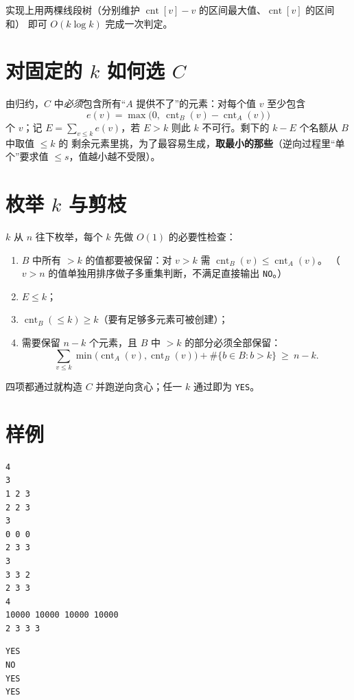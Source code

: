 \documentclass[11pt,a4paper]{article}
\begin{document}
实现上用两棵线段树（分别维护 $\operatorname{cnt}[v]-v$ 的区间最大值、$\operatorname{cnt}[v]$ 的区间和）
即可 $O(k\log k)$ 完成一次判定。

\section{对固定的 $k$ 如何选 $C$}

由归约，$C$ 中\emph{必须}包含所有“$A$ 提供不了”的元素：对每个值 $v$ 至少包含
\[
e(v)=\max\bigl(0,\ \operatorname{cnt}_B(v)-\operatorname{cnt}_A(v)\bigr)
\]
个 $v$；记 $E=\sum_{v\le k}e(v)$，若 $E>k$ 则此 $k$ 不可行。剩下的 $k-E$ 个名额从 $B$ 中取值 $\le k$ 的
剩余元素里挑，为了最容易生成，\textbf{取最小的那些}（逆向过程里“单个”要求值 $\le s$，值越小越不受限）。

\section{枚举 $k$ 与剪枝}

$k$ 从 $n$ 往下枚举，每个 $k$ 先做 $O(1)$ 的必要性检查：

\begin{enumerate}
  \item $B$ 中所有 $>k$ 的值都要被保留：对 $v>k$ 需 $\operatorname{cnt}_B(v)\le\operatorname{cnt}_A(v)$。
        （$v>n$ 的值单独用排序做子多重集判断，不满足直接输出 \texttt{NO}。）
  \item $E\le k$；
  \item $\operatorname{cnt}_B(\le k)\ge k$（要有足够多元素可被创建）；
  \item 需要保留 $n-k$ 个元素，且 $B$ 中 $>k$ 的部分必须全部保留：
        \[
        \sum_{v\le k}\min\bigl(\operatorname{cnt}_A(v),\operatorname{cnt}_B(v)\bigr)
        +\#\{b\in B:b>k\}\ \ge\ n-k .
        \]
\end{enumerate}

四项都通过就构造 $C$ 并跑逆向贪心；任一 $k$ 通过即为 \texttt{YES}。

\section{样例}

\begin{center}
\begin{minipage}[t]{0.42\textwidth}
\begin{lstlisting}[numbers=none,frame=single]
4
3
1 2 3
2 2 3
3
0 0 0
2 3 3
3
3 3 2
2 3 3
4
10000 10000 10000 10000
2 3 3 3
\end{lstlisting}
\end{minipage}\hfill
\begin{minipage}[t]{0.30\textwidth}
\begin{lstlisting}[numbers=none,frame=single]
YES
NO
YES
YES
\end{lstlisting}
\end{minipage}
\end{center}
\end{document}
